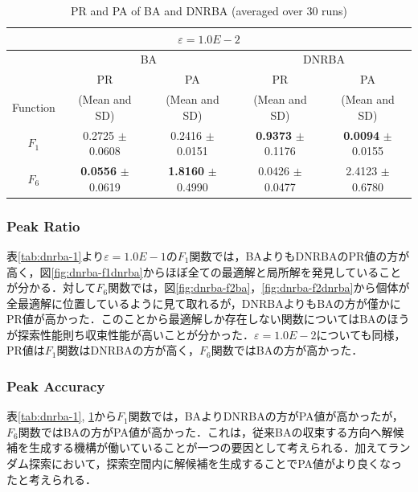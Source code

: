 \documentclass[a4j,11pt]{jarticle}
\begin{document}
\begin{table}[h]
\caption{PR and PA of BA and DNRBA (averaged over 30 runs)}
\begin{center}
\begin{tabular}{c|c|c|c|c}
\multicolumn{5}{c}{$\varepsilon = 1.0E-2$} \\
\hline
\multicolumn{1}{c|}{} & \multicolumn{2}{c|}{BA} & \multicolumn{2}{c}{DNRBA} \\
\hline
 & PR & PA & PR & PA \\

Function & (Mean and SD) & (Mean and SD) & (Mean and SD) & (Mean and SD) \\
\hline
$F_1 $ & 0.2725 $\pm$ 0.0608 & 0.2416 $\pm$ 0.0151 & {\bf 0.9373} $\pm$ 0.1176  & {\bf 0.0094} $\pm$ 0.0155  \\
\hline
$F_6 $ & {\bf 0.0556} $\pm$ 0.0619 & {\bf 1.8160} $\pm$ 0.4990 & 0.0426 $\pm$ 0.0477 & 2.4123 $\pm$ 0.6780 \\
\hline

\end{tabular}
\label{tab:dnrba-2}
\end{center}
\end{table}

\subsubsection{Peak Ratio}
表\ref{tab:dnrba-1}より$\varepsilon=1.0E-1$の$F_1$関数では，BAよりもDNRBAのPR値の方が高く，図\ref{fig:dnrba-f1dnrba}からほぼ全ての最適解と局所解を発見していることが分かる．対して$F_6$関数では，図\ref{fig:dnrba-f2ba}，\ref{fig:dnrba-f2dnrba}から個体が全最適解に位置しているように見て取れるが，DNRBAよりもBAの方が僅かにPR値が高かった．このことから最適解しか存在しない関数についてはBAのほうが探索性能則ち収束性能が高いことが分かった．$\varepsilon=1.0E-2$についても同様，PR値は$F_1$関数はDNRBAの方が高く，$F_6$関数ではBAの方が高かった．

\subsubsection{Peak Accuracy}
表\ref{tab:dnrba-1}, \ref{tab:dnrba-2}から$F_1$関数では，BAよりDNRBAの方がPA値が高かったが，$F_6$関数ではBAの方がPA値が高かった．これは，従来BAの収束する方向へ解候補を生成する機構が働いていることが一つの要因として考えられる．加えてランダム探索において，探索空間内に解候補を生成することでPA値がより良くなったと考えられる．
\end{document}
